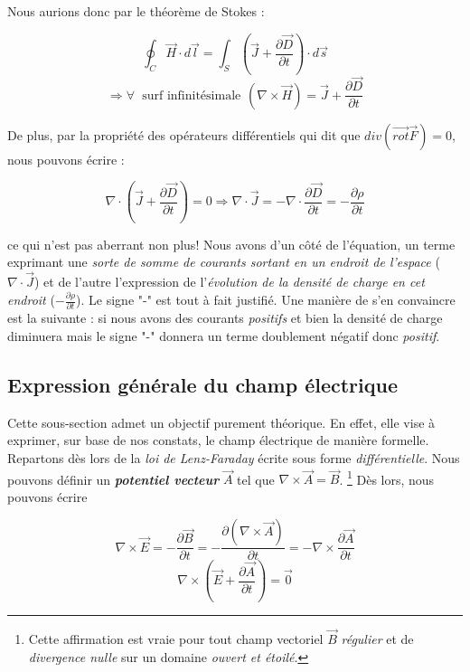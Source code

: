 \documentclass[a4paper,12pt]{article}
\begin{document}
Nous aurions donc par le théorème de Stokes : 

\[ \oint_{C} \vec{H} \cdot d\vec{l} = \int_{S} (\vec{J} +\frac{\partial \vec{D}}{\partial t}) \cdot d\vec{s} \]
\[ \Rightarrow \forall  \hspace{3pt} \mbox{ surf infinitésimale} \hspace{5pt} (\nabla \times \vec{H} ) = \vec{J} + \frac{\partial \vec{D}}{\partial t}\]

De plus, par la propriété des opérateurs différentiels qui dit que $div(\vec{rot}\vec{F}) = 0$, nous pouvons écrire : 

\[ \nabla \cdot (\vec{J} + \frac{\partial \vec{D}}{\partial t}) = 0 \Rightarrow \nabla \cdot \vec{J} = - \nabla \cdot \frac{\partial \vec{D}}{\partial t} = - \frac{\partial \rho}{\partial t}\]

ce qui n'est pas aberrant non plus! Nous avons d'un côté de l'équation, un terme exprimant une \textit{sorte de somme de courants sortant en un endroit de l'espace} ($\nabla \cdot \vec{J}$) et de l'autre l'expression de l'\textit{évolution de la densité de charge en cet endroit} ($- \frac{\partial \rho}{\partial t}$). Le signe "-" est tout à fait justifié. Une manière de s'en convaincre est la suivante : si nous avons des courants \textit{positifs} et bien la densité de charge diminuera mais le signe "-" donnera un terme doublement négatif donc \textit{positif}.

\subsection{Expression générale du champ électrique}

Cette sous-section admet un objectif purement théorique. En effet, elle vise à exprimer, sur base de nos constats, le champ électrique de manière formelle. 
Repartons dès lors de la \textit{loi de Lenz-Faraday} écrite sous forme \textit{différentielle}.
Nous pouvons définir un \textit{\textbf{potentiel vecteur}} $\vec{A}$ tel que $\nabla \times \vec{A} = \vec{B}$. \footnote{Cette affirmation est vraie pour tout champ vectoriel $\vec{B}$ \textit{régulier} et de \textit{divergence nulle} sur un domaine \textit{ouvert et étoilé}.} Dès lors, nous pouvons écrire 

\[\nabla \times \vec{E} = - \frac{\partial \vec{B}}{\partial t} = -\frac{\partial (\nabla \times \vec{A})}{\partial t} = - \nabla \times \frac{\partial \vec{A}}{\partial t} \]
\[\nabla \times (\vec{E} + \frac{\partial \vec{A}}{\partial t}) = \vec{0} \]
\end{document}
